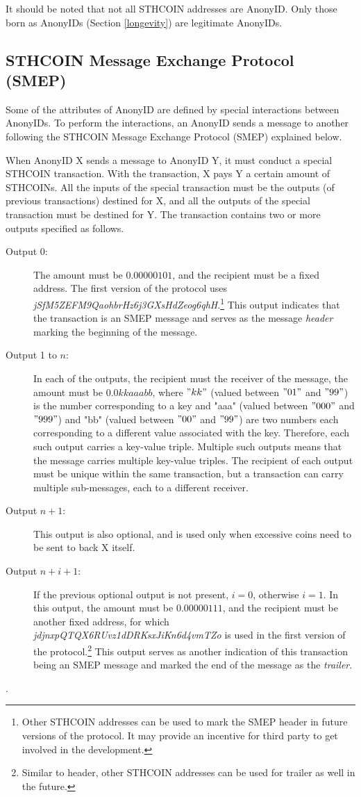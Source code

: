 \documentclass[12pt, a4paper]{article}
\begin{document}
It should be noted that not all STHCOIN addresses are AnonyID. Only those born as AnonyIDs (Section \ref{longevity}) are legitimate AnonyIDs.

\subsection{STHCOIN Message Exchange Protocol (SMEP)}
\label{smep}

Some of the attributes of AnonyID are defined by special interactions between AnonyIDs. To perform the interactions, an AnonyID sends a message to another following the STHCOIN Message Exchange Protocol (SMEP) explained below.

When AnonyID X sends a message to AnonyID Y, it must conduct a special STHCOIN transaction. With the transaction, X pays Y a certain amount of STHCOINs. All the inputs of the special transaction must be the outputs (of previous transactions) destined for X, and all the outputs of the special transaction must be destined for Y. The transaction contains two or more outputs specified as follows.

\begin{description}
\item[Output 0:] The amount must be $0.00000101$, and the recipient must be a fixed address. The first version of the protocol uses {\em jSfM5ZEFM9QaohbrHz6j3GXsHdZeog6qhH}.\footnote{Other STHCOIN addresses can be used to mark the SMEP header in future versions of the protocol. It may provide an incentive for third party to get involved in the development.} This output indicates that the transaction is an SMEP message and serves as the message {\em header} marking the beginning of the message.
\item[Output 1 to $n$:] In each of the outputs, the recipient must the receiver of the message, the amount must be $0.0kkaaabb$, where $"kk"$ (valued between $"01"$ and $"99"$) is the number corresponding to a key and "aaa" (valued between $"000"$ and $"999"$) and "bb" (valued between $"00"$ and $"99"$) are two numbers each corresponding to a different value associated with the key. Therefore, each such output carries a key-value triple. Multiple such outputs means that the message carries multiple key-value triples. The recipient of each output must be unique within the same transaction, but a transaction can carry multiple sub-messages, each to a different receiver.
\item[Output $n+1$:] This output is also optional, and is used only when excessive coins need to be sent to back X itself. 
\item[Output $n+i+1$:] If the previous optional output is not present, $i = 0$, otherwise $i = 1$. In this output, the amount must be $0.00000111$, and the recipient must be another fixed address, for which {\em jdjnxpQTQX6RUvz1dDRKsxJiKn6d4vmTZo} is used in the first version of the protocol.\footnote{Similar to header, other STHCOIN addresses can be used for trailer as well in the future.} This output serves as another indication of this transaction being an SMEP message and marked the end of the message as the {\em trailer}.
\end{description}. 
\end{document}
